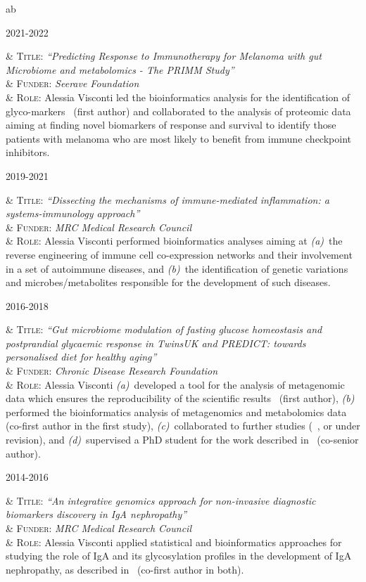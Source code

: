 \documentclass[a4paper,10pt]{article}
\newenvironment{singletablelist}
{	\vspace{-0.2cm}
	\begin{longtable}[!h]{ab}}{\end{longtable}
}
\newcommand{\stlist}[2]{
	\hspace{-3cm}
	\noindent
	\begin{minipage}{0.24\textwidth}
	\begin{flushright}
	\textsc{#1}
	\end{flushright}
	\end{minipage}
	& #2\\[0.2cm]
}
\begin{document}
\begin{singletablelist}

	\stlist{2021-2022}{
		\textsc{Title:} \emph{``Predicting Response to Immunotherapy for Melanoma with gut Microbiome and metabolomics - The PRIMM Study''}\\
		& \textsc{Funder:} \emph{Seerave Foundation}\\
		& \textsc{Role:} Alessia Visconti led the bioinformatics analysis for the identification of glyco-markers~\cite{Vis23} (first author) and collaborated to the analysis of proteomic data~\cite{Ros22} aiming at finding novel biomarkers of response and survival to identify those patients with melanoma who are most likely to benefit from immune checkpoint inhibitors.}
	
	\stlist{2019-2021}{ 
		\textsc{Title:} \emph{``Dissecting the mechanisms of immune-mediated inflammation: a systems-immunology approach''}\\
		& \textsc{Funder:} \emph{MRC Medical Research Council}\\
		& \textsc{Role:} Alessia Visconti performed bioinformatics analyses aiming at \emph{(a)}~the reverse engineering of immune cell co-expression networks and their involvement in a set of autoimmune diseases, and \emph{(b)}~the identification of genetic variations and microbes/metabolites responsible for the development of such diseases.}
	
	\stlist{2016-2018}{ 
		\textsc{Title:} \emph{``Gut microbiome modulation of fasting glucose homeostasis and postprandial glycaemic response in TwinsUK and PREDICT: towards personalised diet for healthy aging''}\\
		& \textsc{Funder:} \emph{Chronic Disease Research Foundation}\\
		& \textsc{Role:} Alessia Visconti \emph{(a)}~developed a tool for the analysis of metagenomic data which ensures the reproducibility of the scientific results~\cite{Vis18b} (first author), \emph{(b)} performed the bioinformatics analysis of metagenomics and metabolomics data~\cite{Vis19,Bar20} (co-first author in the first study), \emph{(c)}~collaborated to further studies (~\cite{Lou23}, or under revision), and \emph{(d)}~supervised a PhD student for the work described in~\cite{Zha22} (co-senior author).}

	\stlist{2014-2016}{  
		\textsc{Title:} \emph{``An integrative genomics approach for non-invasive diagnostic biomarkers discovery in IgA nephropathy''}\\
		& \textsc{Funder:} \emph{MRC Medical Research Council}\\
		& \textsc{Role:} Alessia Visconti applied statistical and bioinformatics approaches for studying the role of IgA and its glycosylation profiles in the development of IgA nephropathy, as described in~\cite{Lom16,Dot21} (co-first author in both).}
	

\end{singletablelist}
\end{document}
